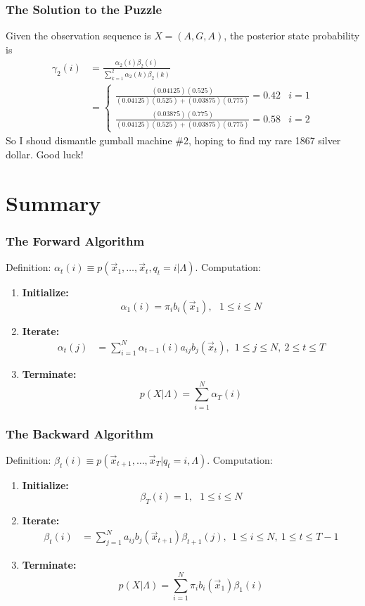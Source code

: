 \documentclass{beamer}
\begin{document}
\begin{frame}
  \frametitle{The Solution to the Puzzle}

  Given the observation sequence is $X=(A,G,A)$, 
  the posterior state probability is
  \begin{align*}
    \gamma_2(i)&=\frac{\alpha_2(i)\beta_2(i)}{\sum_{k=1}^2\alpha_2(k)\beta_2(k)}\\
    &= \begin{cases}
      \frac{(0.04125)(0.525)}{(0.04125)(0.525)+(0.03875)(0.775)}
      = 0.42 & i=1\\
      \frac{(0.03875)(0.775)}{(0.04125)(0.525)+(0.03875)(0.775)}
      = 0.58 & i=2
    \end{cases}
  \end{align*}
  So I shoud dismantle gumball machine \#2, hoping to find my rare
  1867 silver dollar.  Good luck!
\end{frame}

\section[Summary]{Summary}
\setcounter{subsection}{1}

\begin{frame}
  \frametitle{The Forward Algorithm}

  Definition: $\alpha_t(i) \equiv p(\vec{x}_1,\ldots,\vec{x}_t,q_t=i|\Lambda)$.  Computation:
  \begin{enumerate}
  \item {\bf Initialize:}
    \[
    \alpha_1(i) = \pi_i b_i(\vec{x}_1),~~~1\le i\le N
    \]
  \item {\bf Iterate:}
    \begin{align*}
      \alpha_{t}(j) &= \sum_{i=1}^N \alpha_{t-1}(i) a_{ij}b_j(\vec{x}_t),~~1\le j\le N,~2\le t\le T
    \end{align*}
  \item {\bf Terminate:}
    \[
    p(X|\Lambda) = \sum_{i=1}^N \alpha_T(i)
    \]
  \end{enumerate}
\end{frame}
  
\begin{frame}
  \frametitle{The Backward Algorithm}

  Definition: $\beta_t(i) \equiv p(\vec{x}_{t+1},\ldots,\vec{x}_T|q_t=i,\Lambda)$.  Computation:
  \begin{enumerate}
  \item {\bf Initialize:}
    \[
    \beta_T(i) = 1,~~~1\le i\le N
    \]
  \item {\bf Iterate:}
    \begin{align*}
      \beta_{t}(i) &= \sum_{j=1}^N a_{ij}b_j(\vec{x}_{t+1})\beta_{t+1}(j),~~1\le i\le N,~1\le t\le T-1
    \end{align*}
  \item {\bf Terminate:}
    \[
    p(X|\Lambda) = \sum_{i=1}^N \pi_ib_i(\vec{x}_1)\beta_1(i)
    \]
  \end{enumerate}
\end{frame}
\end{document}
